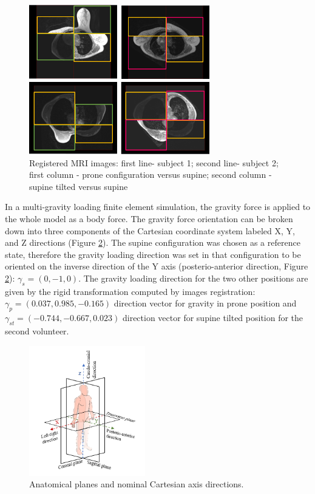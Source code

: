 \begin{figure}[!h]
\centering
\includegraphics[width=0.7\textwidth,keepaspectratio]{figures/patientDataRegistered.png} 
\caption{Registered MRI images: first line- subject 1; second line- subject 2; first column - prone configuration versus supine; second column - supine tilted versus supine }\label{fig:patientdataregistered}
\end{figure}

In a multi-gravity loading finite element simulation, the gravity force is applied to the whole model as a body force. The gravity force orientation can be broken down into three components of the Cartesian coordinate system labeled X, Y, and Z directions (Figure \ref{fig:xyz_axis_directions}). The supine configuration was chosen as a reference state, therefore the gravity loading direction was set in that configuration to be oriented on the inverse direction of the Y axis (posterio-anterior direction, Figure \ref{fig:xyz_axis_directions}): $\gamma_s = (0,-1,0)$.   The gravity loading direction for the two other positions are given by the rigid transformation computed by images registration: $\gamma_p = (0.037, 0.985, -0.165)$ direction vector for gravity in prone position and $\gamma_{st} = (-0.744 , -0.667, 0.023)$ direction vector for supine tilted position for the second volunteer.

\begin{figure}[!ht]
\centering
\includegraphics[width=0.45\textwidth,keepaspectratio]{figures/xyz_axis_directions.png} 
\caption{Anatomical planes and nominal Cartesian axis directions.}\label{fig:xyz_axis_directions}
\end{figure}

